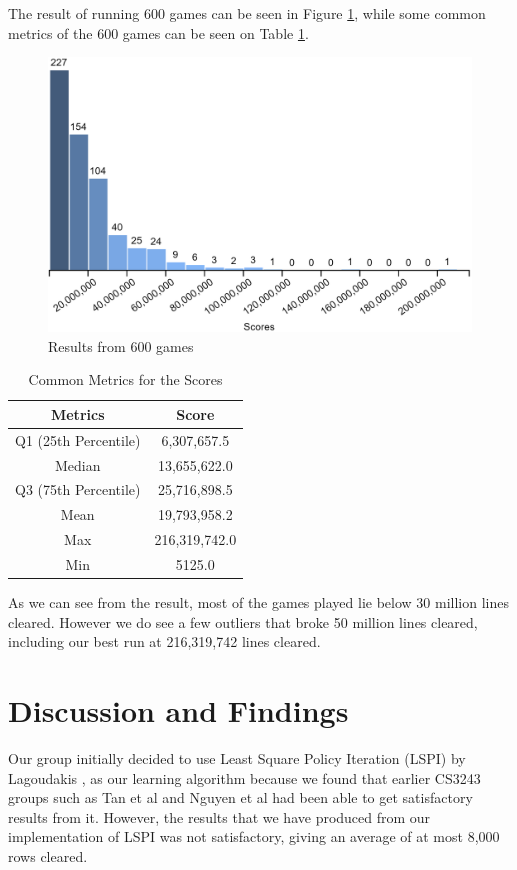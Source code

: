 \documentclass[a4paper,12pt,twocolumn]{article}
\begin{document}
The result of running 600 games can be seen in Figure \ref{score_histogram},
while some common metrics of the 600 games can be seen on Table \ref{metric_scores}.

\begin{figure}[h]
    \centering
    \includegraphics[scale=0.15]{games_600_histogram.png}
    \caption{Results from 600 games}
    \label{score_histogram}
\end{figure}

\begin{table}[h]
    \centering
	\begin{tabular}{|c|c|}
		\hline
		\textbf{Metrics}   & \textbf{Score}     \\
		\hline
		Q1 (25th Percentile)  & 6,307,657.5 \\
		\hline
		Median         & 13,655,622.0  \\
		\hline
		Q3 (75th Percentile)      & 25,716,898.5 \\
		\hline
		Mean & 19,793,958.2 \\
		\hline
		Max     & 216,319,742.0  \\
		\hline
		Min          & 5125.0 \\
		\hline
	\end{tabular}
	\caption{Common Metrics for the Scores}
	\label{metric_scores}
\end{table}

As we can see from the result, most of the games played lie below 30 million lines
cleared. However we do see a few outliers that broke 50 million lines cleared, including
our best run at 216,319,742 lines cleared.

\section{Discussion and Findings}
\label{discussion_n_findings}
Our group initially decided to use Least Square Policy Iteration (LSPI) by Lagoudakis \cite{lagoudakis},
as our learning algorithm because we found that earlier CS3243 groups such as
Tan et al \cite{shawntan} and Nguyen et al \cite{nhannguyen} had been able to get
satisfactory results from it. However, the results that we have produced from our
implementation of LSPI was not satisfactory, giving an average of at most 8,000 rows
cleared.\\
\end{document}
